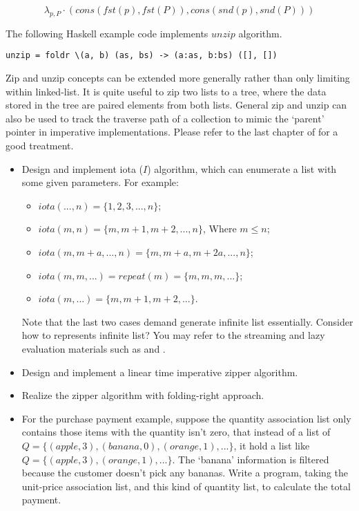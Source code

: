 \documentclass[b5paper]{article}
\begin{document}
\[
\lambda_{p, P} \cdot (cons(fst(p), fst(P)), cons(snd(p), snd(P)))
\]

The following Haskell example code implements $unzip$ algorithm.

\lstset{language=Haskell}
\begin{lstlisting}
unzip = foldr \(a, b) (as, bs) -> (a:as, b:bs) ([], [])
\end{lstlisting}

Zip and unzip concepts can be extended more generally rather than only limiting within linked-list. It is quite
useful to zip two lists to a tree, where the data stored in the tree are paired elements from both lists.
General zip and unzip can also be used to track the traverse path of a collection to mimic the `parent' pointer
in imperative implementations. Please refer to the last chapter of \cite{learn-haskell} for a good treatment.

\begin{Exercise}
\begin{itemize}
\item Design and implement iota ($I$) algorithm, which can enumerate a list with some given parameters. For example:
  \begin{itemize}
  \item $iota(..., n) = \{1, 2, 3, ..., n\}$;
  \item $iota(m, n) = \{m, m+1, m+2, ..., n\}$, Where $m \leq n$;
  \item $iota(m, m+a, ..., n) = \{m, m+a, m+2a, ..., n \}$;
  \item $iota(m, m, ...) = repeat(m) = \{m, m, m, ...\}$;
  \item $iota(m, ...) = \{m, m+1, m+2, ... \}$.
  \end{itemize}
  Note that the last two cases demand generate infinite list essentially. Consider how to represents infinite list?
  You may refer to the streaming and lazy evaluation materials such as \cite{SICP} and \cite{learn-haskell}.
\item Design and implement a linear time imperative zipper algorithm.
\item Realize the zipper algorithm with folding-right approach.
\item For the purchase payment example, suppose the quantity association list only contains those items with
the quantity isn't zero, that instead of a list of $Q = \{(apple, 3), (banana, 0), (orange, 1), ...\}$, it
hold a list like $Q = \{(apple, 3), (orange, 1), ...\}$. The `banana' information is filtered because the customer
doesn't pick any bananas. Write a program, taking the unit-price association list, and this kind of quantity
list, to calculate the total payment.
\end{itemize}
\end{Exercise}
\end{document}
